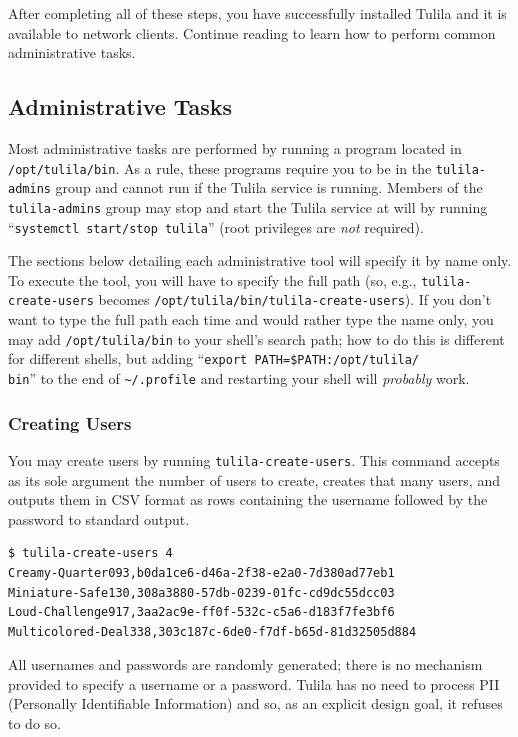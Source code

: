 \documentclass[12pt]{article}
\begin{document}
After completing all of these steps, you have successfully installed Tulila  and it is available to network clients. Continue reading to learn how to perform common administrative tasks.


\subsection{Administrative Tasks}
\label{section:administrative-tasks}

Most administrative tasks are performed by running a program located in \texttt{/opt/tulila/bin}. As a rule, these programs require you to be in the \texttt{tulila-admins} group and cannot run if the Tulila service is running. Members of the \texttt{tulila-admins} group may stop and start the Tulila service at will by running ``\texttt{systemctl start/stop tulila}'' (root privileges are \textit{not} required).

The sections below detailing each administrative tool will specify it by name only. To execute the tool, you will have to specify the full path (so, e.g., \texttt{tulila-create-users} becomes \texttt{/opt/tulila/bin/tulila-create-users}). If you don't want to type the full path each time and would rather type the name only, you may add \texttt{/opt/tulila/bin} to your shell's search path; how to do this is different for different shells, but adding ``\texttt{export PATH=\$PATH:/opt/tulila/\\bin}'' to the end of \texttt{\textasciitilde{}/.profile} and restarting your shell will \textit{probably} work.

\subsubsection{Creating Users}

You may create users by running \texttt{tulila-create-users}. This command accepts as its sole argument the number of users to create, creates that many users, and outputs them in CSV format as rows containing the username followed by the password to standard output.

\begin{Verbatim}
$ tulila-create-users 4
Creamy-Quarter093,b0da1ce6-d46a-2f38-e2a0-7d380ad77eb1
Miniature-Safe130,308a3880-57db-0239-01fc-cd9dc55dcc03
Loud-Challenge917,3aa2ac9e-ff0f-532c-c5a6-d183f7fe3bf6
Multicolored-Deal338,303c187c-6de0-f7df-b65d-81d32505d884
\end{Verbatim}

All usernames and passwords are randomly generated; there is no mechanism provided to specify a username or a password. Tulila has no need to process PII (Personally Identifiable Information) and so, as an explicit design goal, it refuses to do so.
\end{document}
